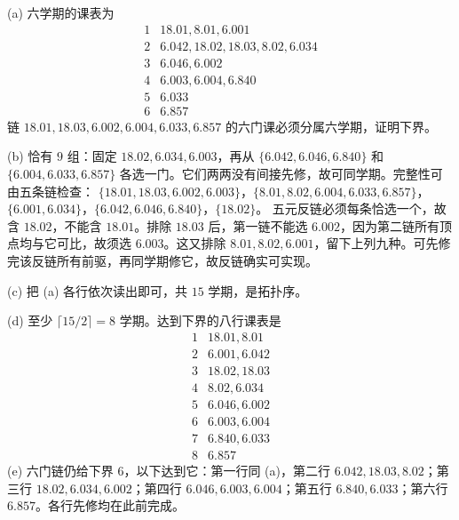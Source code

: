 \begin{solution}
(a) 六学期的课表为
\[
\begin{array}{c|l}
1&18.01,8.01,6.001\\2&6.042,18.02,18.03,8.02,6.034\\
3&6.046,6.002\\4&6.003,6.004,6.840\\5&6.033\\6&6.857
\end{array}
\]
链 $18.01,18.03,6.002,6.004,6.033,6.857$ 的六门课必须分属六学期，证明下界。

(b) 恰有 $9$ 组：固定 $18.02,6.034,6.003$，再从 $\{6.042,6.046,6.840\}$ 和 $\{6.004,6.033,6.857\}$ 各选一门。它们两两没有间接先修，故可同学期。完整性可由五条链检查：
$\{18.01,18.03,6.002,6.003\}$，$\{8.01,8.02,6.004,6.033,6.857\}$，$\{6.001,6.034\}$，$\{6.042,6.046,6.840\}$，$\{18.02\}$。
五元反链必须每条恰选一个，故含 $18.02$，不能含 $18.01$。排除 $18.03$ 后，第一链不能选 $6.002$，因为第二链所有顶点均与它可比，故须选 $6.003$。这又排除 $8.01,8.02,6.001$，留下上列九种。可先修完该反链所有前驱，再同学期修它，故反链确实可实现。

(c) 把 (a) 各行依次读出即可，共 $15$ 学期，是拓扑序。

(d) 至少 $\lceil15/2\rceil=8$ 学期。达到下界的八行课表是
\[
\begin{array}{c|l}
1&18.01,8.01\\2&6.001,6.042\\3&18.02,18.03\\4&8.02,6.034\\
5&6.046,6.002\\6&6.003,6.004\\7&6.840,6.033\\8&6.857
\end{array}
\]
(e) 六门链仍给下界 $6$，以下达到它：第一行同 (a)，第二行 $6.042,18.03,8.02$；第三行 $18.02,6.034,6.002$；第四行 $6.046,6.003,6.004$；第五行 $6.840,6.033$；第六行 $6.857$。各行先修均在此前完成。
\end{solution}


